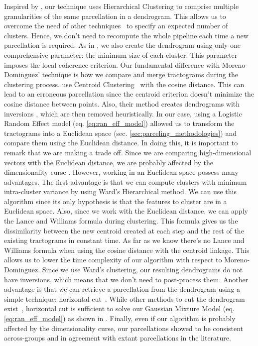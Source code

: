 Inspired by \citet{Moreno-Dominguez2014}, our technique uses Hierarchical
Clustering to comprise multiple granularities of the same parcellation in a
dendrogram. This allows us to overcome the need of other techniques~\citep{Paristot2015}
to specify an expected number of clusters. Hence, we don’t need to recompute the
whole pipeline each time a new parcellation is required. As in
\citet{Moreno-Dominguez2014}, we also create the dendrogram using only one
comprehensive parameter: the minimum size of each cluster. This
parameter imposes the local coherence criterion. Our fundamental difference
with Moreno-Dominguez' technique is how we compare and merge tractograms during
the clustering process. \citet{Moreno-Dominguez2014} use Centroid
Clustering~\citep{Murtagh1985} with the cosine distance. This can lead to an
erroneous parcellation since the centroid criterion doesn't minimize the cosine
distance between points. Also, their method creates dendrograms with inversions
\citep{Murtagh1985}, which are then removed heuristically. In our case, using a
Logistic Random Effect model (eq. \ref{eq:ran_eff_model}) allowed us to transform
the tractograms into a Euclidean space (sec. \ref{sec:parceling_methodologies})
and compare them using the Euclidean distance. In doing this, it is important to
remark that we are making a trade off. Since we are comparing high-dimensional
vectors with the Euclidean distance, we are probably affected by the dimensionality
curse \citep{Beyer1999}. However, working in an Euclidean space possess many
advantages. The first advantage is that we can compute clusters with minimum
intra-cluster variance by using Ward's Hierarchical method. We can use this algorithm
since its only hypothesis is that the features to cluster are in a Euclidean space.
Also, since we work with the Euclidean distance, we can apply the Lance and Williams
\citep{Lance} formula during clustering. This formula gives us the dissimilarity
between the new centroid created at each step and the rest of the existing
tractograms in constant time. As far as we know there's no Lance and Williams
formula when using the cosine distance with the centroid linkage. This allows
us to lower the time complexity of our algorithm with respect to Moreno-Dominguez.
Since we use Ward's clustering, our resulting dendrograms do not have
inversions, which means that we don't need to post-process them. Another
advantage is that we can retrieve a parcellation from the dendrogram using a
simple technique: horizontal cut~\citep{Murtagh2011}. While other methods to cut
the dendrogram exist~\citep{Murtagh2011}, horizontal cut is sufficient to solve
our Gaussian Mixture Model (eq. \ref{eq:ran_eff_model}) as shown in
\citet{Gallardo2017}. Finally, even if our algorithm is probably affected by
the dimensionality curse, our parcellations showed to be consistent
across-groups and in agreement with extant parcellations in the literature.
%
